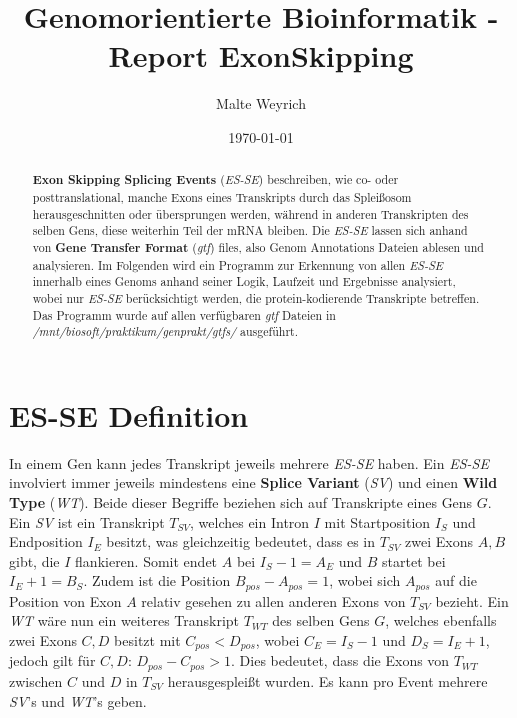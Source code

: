 \documentclass[12pt]{article}
\title{Genomorientierte Bioinformatik - Report ExonSkipping}
\author{
  Malte Weyrich
}
\date{\today}
\begin{document}
\maketitle
\begin{abstract}
    \textbf{Exon Skipping Splicing Events} (\textit{ES-SE}) beschreiben, wie co- oder posttranslational,
    manche Exons eines Transkripts durch das Splei\ss osom herausgeschnitten oder übersprungen werden, während
    in anderen Transkripten des selben Gens, diese weiterhin Teil der mRNA bleiben.
    Die \textit{ES-SE} lassen sich anhand von \textbf{Gene Transfer Format} (\textit{gtf}) files,
    also Genom Annotations Dateien ablesen und analysieren. 
    Im Folgenden wird ein Programm zur Erkennung von allen \textit{ES-SE} innerhalb eines Genoms
    anhand seiner Logik, Laufzeit und Ergebnisse analysiert, wobei nur \textit{ES-SE} berücksichtigt werden,
    die protein-kodierende Transkripte betreffen. Das Programm wurde auf allen verfügbaren
    \textit{gtf} Dateien in \textit{/mnt/biosoft/praktikum/genprakt/gtfs/} ausgeführt.
\end{abstract}

\newpage
\tableofcontents
\newpage



\section{ES-SE Definition}\label{sec:problem}
In einem Gen kann jedes Transkript jeweils mehrere \textit{ES-SE} haben.
Ein \textit{ES-SE} involviert immer jeweils mindestens eine \textbf{Splice Variant} (\textit{SV}) und einen 
\textbf{Wild Type} (\textit{WT}). Beide dieser Begriffe beziehen sich auf Transkripte eines Gens $G$.
Ein \textit{SV} ist ein Transkript $T_{SV}$, welches ein Intron $I$ mit Startposition $I_{S}$ und Endposition
$I_{E}$ besitzt, was gleichzeitig bedeutet, dass es in $T_{SV}$ zwei Exons $A, B$ gibt, die $I$ flankieren. Somit endet $A$ bei $I_{S} - 1 = A_{E}$ und $B$ startet bei $I_{E} + 1 = B_{S}$.
Zudem ist die Position $B_{pos} - A_{pos} = 1$, wobei sich $A_{pos}$ auf die Position von Exon $A$ relativ gesehen 
zu allen anderen Exons von $T_{SV}$ bezieht.
Ein \textit{WT} wäre nun ein weiteres Transkript $T_{WT}$ des selben Gens $G$, welches ebenfalls
zwei Exons $C, D$ besitzt mit $C_{pos} < D_{pos}$, wobei $C_{E} = I_{S} - 1$ und $D_{S} = I_{E} + 1$, 
jedoch gilt für $C, D$: $D_{pos} - C_{pos} > 1$. 
Dies bedeutet, dass die Exons von $T_{WT}$ zwischen $C$ und $D$ in $T_{SV}$ herausgesplei\ss t wurden.
Es kann pro Event mehrere \textit{SV}'s und \textit{WT}'s geben.
\end{document}
